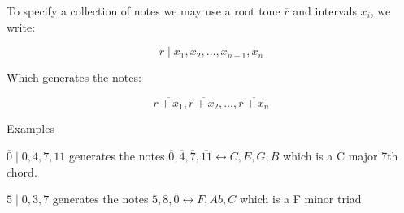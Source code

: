 \documentclass[preview]{standalone}
\begin{document}
\begin{center}
To specify a collection of notes we may use a root tone $\overline{r}$ and intervals $x_i$, we write:

	\[
		  \overline{r} \mid x_{1} , x_{2} , \dotsc  , x_{n - 1} , x_{n}
	\]

	Which generates the notes: 

	\[
	\overline{r  +  x_{1}}, \overline{r  +  x_{2}}, \ldots, \overline{r  +  x_{n}}
    \]

  Examples

	$\overline{0} \mid 0, 4, 7, 11$ generates the notes $ \overline{0}, \overline{4}, \overline{7}, \overline{11} \leftrightarrow C, E, G, B$ which is a C major 7th chord.

	$ \overline{5} \mid 0, 3, 7$ generates the notes $ \overline{5}, \overline{8}, \overline{0} \leftrightarrow F, Ab, C$ which is a F minor triad
\end{center}
\end{document}
